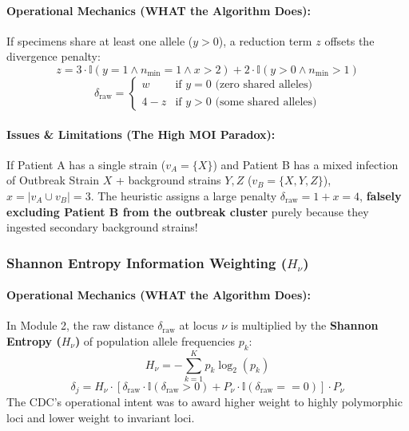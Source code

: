 \documentclass[11pt,a4paper]{article}
\begin{document}
\paragraph{Operational Mechanics (WHAT the Algorithm Does):}
If specimens share at least one allele ($y > 0$), a reduction term $z$ offsets the divergence penalty:
\begin{equation}
z = 3 \cdot \mathbb{I}(y = 1 \land n_{\text{min}} = 1 \land x > 2) + 2 \cdot \mathbb{I}(y > 0 \land n_{\text{min}} > 1)
\end{equation}
\begin{equation}
\delta_{\text{raw}} = \begin{cases}
w & \text{if } y = 0 \text{ (zero shared alleles)} \\
4 - z & \text{if } y > 0 \text{ (some shared alleles)}
\end{cases}
\end{equation}

\paragraph{Issues \& Limitations (The High MOI Paradox):}
If Patient A has a single strain ($v_A = \{X\}$) and Patient B has a mixed infection of Outbreak Strain $X$ + background strains $Y, Z$ ($v_B = \{X, Y, Z\}$), $x = |v_A \cup v_B| = 3$. The heuristic assigns a large penalty $\delta_{\text{raw}} = 1 + x = 4$, \textbf{falsely excluding Patient B from the outbreak cluster} purely because they ingested secondary background strains!

\subsubsection{Shannon Entropy Information Weighting (\texorpdfstring{$H_\nu$}{H\_nu})}

\paragraph{Operational Mechanics (WHAT the Algorithm Does):}
In Module 2, the raw distance $\delta_{\text{raw}}$ at locus $\nu$ is multiplied by the \textbf{Shannon Entropy ($H_\nu$)} of population allele frequencies $p_k$:
\begin{equation}
H_\nu = -\sum_{k=1}^K p_k \log_2(p_k)
\end{equation}
\begin{equation}
\delta_j = H_\nu \cdot \left[ \delta_{\text{raw}} \cdot \mathbb{I}(\delta_{\text{raw}} > 0) + P_\nu \cdot \mathbb{I}(\delta_{\text{raw}} == 0) \right] \cdot P_\nu
\end{equation}
The CDC's operational intent was to award higher weight to highly polymorphic loci and lower weight to invariant loci.
\end{document}
